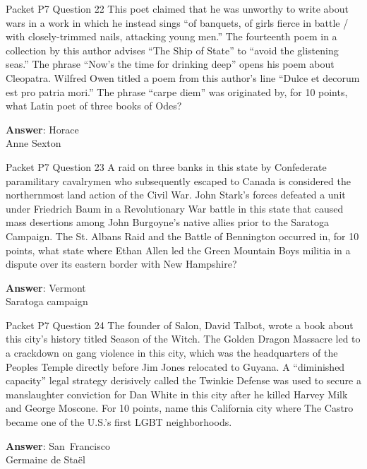 \begin{frame}{Packet P7 Question 22}
This poet claimed that   he was unworthy to write about wars in a work in which he instead sings “of banquets, of girls fierce in battle / with closely-trimmed nails, attacking young men.” The fourteenth poem in a collection by this author advises “The Ship of State” to “avoid the glistening seas.” The phrase “Now’s the time for drinking deep” opens his poem about Cleopatra. Wilfred Owen titled a poem from this author’s line “Dulce et decorum est pro patria mori.”       The phrase “carpe   diem” was originated by, for 10 points, what Latin poet of three books of Odes?

\textbf{Answer}: Horace\\
 Anne Sexton
\end{frame}

\begin{frame}{Packet P7 Question 23}
A raid on three banks in this state by Confederate paramilitary cavalrymen who subsequently escaped to Canada is considered the northernmost land action of the Civil War. John Stark’s     forces defeated a unit under Friedrich Baum in a Revolutionary War battle in this state that caused mass desertions among John Burgoyne’s native allies prior to the Saratoga Campaign. The St. Albans   Raid and the Battle of Bennington occurred in, for 10 points, what state where   Ethan Allen led the Green Mountain Boys   militia in a dispute over its eastern border with New Hampshire?

\textbf{Answer}: Vermont\\
 Saratoga campaign
\end{frame}

\begin{frame}{Packet P7 Question 24}
The founder of Salon,   David Talbot, wrote a book about this city’s history titled Season of the Witch. The Golden Dragon Massacre led to a crackdown on gang violence in this city, which was the headquarters of the Peoples Temple directly before Jim Jones relocated to Guyana. A “diminished capacity” legal strategy derisively called the Twinkie Defense was used to secure a manslaughter conviction for Dan White in this city   after he killed Harvey   Milk and George   Moscone. For 10 points, name this California city where The Castro became one of the U.S.’s first   LGBT neighborhoods.

\textbf{Answer}: San\ Francisco\\
 Germaine de Staël
\end{frame}

